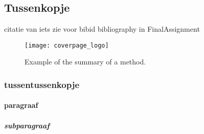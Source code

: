 \subsection{Tussenkopje}
citatie van iets \cite{gitlabwebsite} 
zie voor bibid bibliography in FinalAssignment

\begin{figure}[H]
	\begin{center}
		\texttt{[image: coverpage\_logo]}
		\caption{Example of the summary of a method.}
	\end{center}
\end{figure}
\subsubsection{tussentussenkopje}
\paragraph{paragraaf}
\subparagraph{subparagraaf} 

